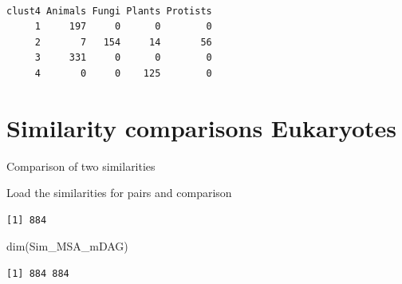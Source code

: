 \documentclass[
  letterpaper,
  DIV=11,
  numbers=noendperiod]{scrreprt}
\newenvironment{Shaded}{\begin{snugshade}}{\end{snugshade}}
\newcommand{\DecValTok}[1]{\textcolor[rgb]{0.68,0.00,0.00}{#1}}
\newcommand{\FunctionTok}[1]{\textcolor[rgb]{0.28,0.35,0.67}{#1}}
\newcommand{\NormalTok}[1]{\textcolor[rgb]{0.00,0.23,0.31}{#1}}
\newcommand{\OtherTok}[1]{\textcolor[rgb]{0.00,0.23,0.31}{#1}}
\newcommand{\SpecialCharTok}[1]{\textcolor[rgb]{0.37,0.37,0.37}{#1}}
\begin{document}
\begin{Shaded}
\end{Shaded}

\begin{verbatim}
      
clust4 Animals Fungi Plants Protists
     1     197     0      0        0
     2       7   154     14       56
     3     331     0      0        0
     4       0     0    125        0
\end{verbatim}


\hypertarget{similarity-comparisons-eukaryotes}{%
\chapter*{Similarity comparisons
Eukaryotes}\label{similarity-comparisons-eukaryotes}}


Comparison of two similarities

Load the similarities for pairs and comparison

\begin{Shaded}
\end{Shaded}

\begin{verbatim}
[1] 884
\end{verbatim}

\begin{Shaded}
\begin{Highlighting}[]
\FunctionTok{dim}\NormalTok{(Sim\_MSA\_mDAG)}
\end{Highlighting}
\end{Shaded}

\begin{verbatim}
[1] 884 884
\end{verbatim}
\end{document}
